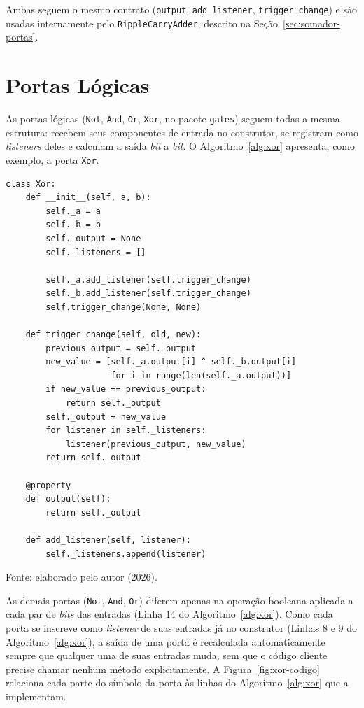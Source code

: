 Ambas seguem o mesmo contrato (\texttt{output}, \texttt{add\_listener}, \texttt{trigger\_change}) e são usadas internamente pelo \texttt{RippleCarryAdder}, descrito na Seção~\ref{sec:somador-portas}.

\section{Portas Lógicas}
\label{sec:portas}

As portas lógicas (\texttt{Not}, \texttt{And}, \texttt{Or}, \texttt{Xor}, no pacote \texttt{gates}) seguem todas a mesma estrutura: recebem seus componentes de entrada no construtor, se registram como \textit{listeners} deles e calculam a saída \textit{bit} a \textit{bit}. O Algoritmo~\ref{alg:xor} apresenta, como exemplo, a porta \texttt{Xor}.

\begin{algoritmo}[H]
\caption{Porta Xor (gates/xor\_gate.py).}
\label{alg:xor}
\begin{verbatim}
class Xor:
    def __init__(self, a, b):
        self._a = a
        self._b = b
        self._output = None
        self._listeners = []

        self._a.add_listener(self.trigger_change)
        self._b.add_listener(self.trigger_change)
        self.trigger_change(None, None)

    def trigger_change(self, old, new):
        previous_output = self._output
        new_value = [self._a.output[i] ^ self._b.output[i]
                     for i in range(len(self._a.output))]
        if new_value == previous_output:
            return self._output
        self._output = new_value
        for listener in self._listeners:
            listener(previous_output, new_value)
        return self._output

    @property
    def output(self):
        return self._output

    def add_listener(self, listener):
        self._listeners.append(listener)
\end{verbatim}
\begin{center}
\footnotesize Fonte: elaborado pelo autor (2026).
\end{center}
\end{algoritmo}

As demais portas (\texttt{Not}, \texttt{And}, \texttt{Or}) diferem apenas na operação booleana aplicada a cada par de \textit{bits} das entradas (Linha 14 do Algoritmo~\ref{alg:xor}). Como cada porta se inscreve como \textit{listener} de suas entradas já no construtor (Linhas 8 e 9 do Algoritmo~\ref{alg:xor}), a saída de uma porta é recalculada automaticamente sempre que qualquer uma de suas entradas muda, sem que o código cliente precise chamar nenhum método explicitamente. A Figura~\ref{fig:xor-codigo} relaciona cada parte do símbolo da porta às linhas do Algoritmo~\ref{alg:xor} que a implementam.

